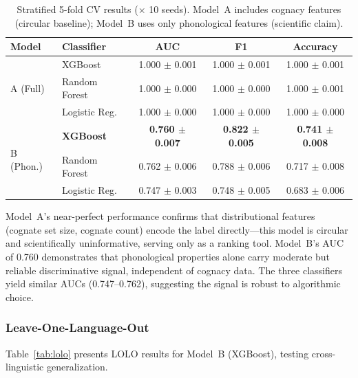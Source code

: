 \documentclass[12pt]{article}
\begin{document}
\begin{table}[H]
\centering
\caption{Stratified 5-fold CV results ($\times$ 10 seeds). Model~A includes cognacy features (circular baseline); Model~B uses only phonological features (scientific claim).}
\label{tab:cv_results}
\begin{tabular}{llccc}
\toprule
Model & Classifier & AUC & F1 & Accuracy \\
\midrule
\multirow{3}{*}{A (Full)} & XGBoost & 1.000 $\pm$ 0.001 & 1.000 $\pm$ 0.001 & 1.000 $\pm$ 0.001 \\
 & Random Forest & 1.000 $\pm$ 0.000 & 1.000 $\pm$ 0.000 & 1.000 $\pm$ 0.001 \\
 & Logistic Reg. & 1.000 $\pm$ 0.000 & 1.000 $\pm$ 0.000 & 1.000 $\pm$ 0.000 \\
\midrule
\multirow{3}{*}{B (Phon.)} & \textbf{XGBoost} & \textbf{0.760 $\pm$ 0.007} & \textbf{0.822 $\pm$ 0.005} & \textbf{0.741 $\pm$ 0.008} \\
 & Random Forest & 0.762 $\pm$ 0.006 & 0.788 $\pm$ 0.006 & 0.717 $\pm$ 0.008 \\
 & Logistic Reg. & 0.747 $\pm$ 0.003 & 0.748 $\pm$ 0.005 & 0.683 $\pm$ 0.006 \\
\bottomrule
\end{tabular}
\end{table}

Model~A's near-perfect performance confirms that distributional features (cognate set size, cognate count) encode the label directly---this model is circular and scientifically uninformative, serving only as a ranking tool.
Model~B's AUC of 0.760 demonstrates that phonological properties alone carry moderate but reliable discriminative signal, independent of cognacy data.
The three classifiers yield similar AUCs (0.747--0.762), suggesting the signal is robust to algorithmic choice.

\subsubsection{Leave-One-Language-Out}

Table~\ref{tab:lolo} presents LOLO results for Model~B (XGBoost), testing cross-linguistic generalization.
\end{document}
